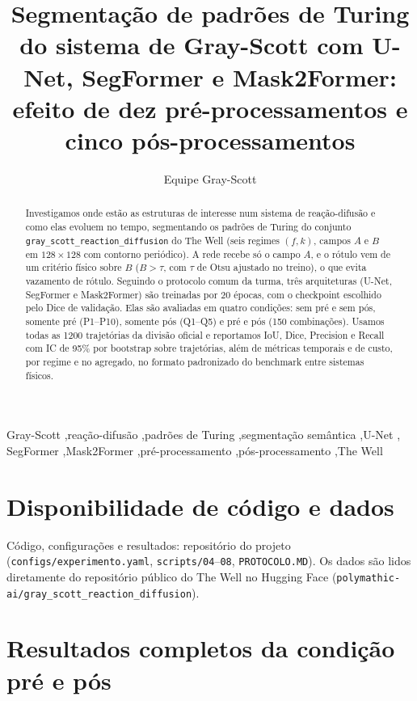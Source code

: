 \documentclass[preprint,12pt,a4paper]{elsarticle}
\newcommand{\resdir}{piloto}
\newcommand{\tabres}[1]{}
\begin{document}
\begin{frontmatter}

\title{Segmentação de padrões de Turing do sistema de Gray-Scott com U-Net, SegFormer e
Mask2Former: efeito de dez pré-processamentos e cinco pós-processamentos}

\author[ufma]{Equipe Gray-Scott}

\begin{abstract}
Investigamos onde estão as estruturas de interesse num sistema de reação-difusão e como elas
evoluem no tempo, segmentando os padrões de Turing do conjunto \texttt{gray\_scott\_reaction\_diffusion}
do The Well (seis regimes $(f,k)$, campos $A$ e $B$ em $128\times128$ com contorno periódico). A
rede recebe só o campo $A$, e o rótulo vem de um critério físico sobre $B$ ($B>\tau$, com $\tau$
de Otsu ajustado no treino), o que evita vazamento de rótulo. Seguindo o protocolo comum da turma,
três arquiteturas (U-Net, SegFormer e Mask2Former) são treinadas por 20 épocas, com o checkpoint
escolhido pelo Dice de validação. Elas são avaliadas em quatro condições: sem pré e sem pós,
somente pré (P1--P10), somente pós (Q1--Q5) e pré e pós (150 combinações). Usamos todas as 1200
trajetórias da divisão oficial e reportamos IoU, Dice, Precision e Recall com IC de 95\% por
bootstrap sobre trajetórias, além de métricas temporais e de custo, por regime e no agregado, no
formato padronizado do benchmark entre sistemas físicos.
\end{abstract}

\begin{keyword}
Gray-Scott \sep reação-difusão \sep padrões de Turing \sep segmentação semântica \sep U-Net \sep
SegFormer \sep Mask2Former \sep pré-processamento \sep pós-processamento \sep The Well
\end{keyword}

\end{frontmatter}









\section*{Disponibilidade de código e dados}
Código, configurações e resultados: repositório do projeto (\texttt{configs/experimento.yaml},
\texttt{scripts/04}--\texttt{08}, \texttt{PROTOCOLO.MD}). Os dados são lidos diretamente do repositório público do The Well
no Hugging Face (\texttt{polymathic-ai/gray\_scott\_reaction\_diffusion}).




\appendix
\section{Resultados completos da condição pré e pós}
\tabres{t_condicao_4}
\end{document}
